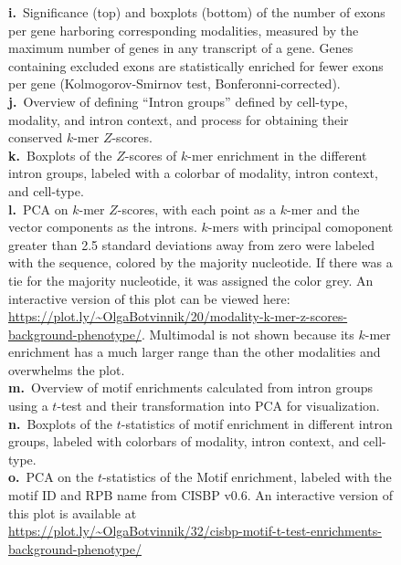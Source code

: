 \begin{figure}[h]
{\textbf{i.}~Significance (top) and boxplots (bottom) of the number of exons per gene harboring corresponding modalities, measured by the maximum number of genes in any transcript of a gene. Genes containing excluded exons are statistically enriched for fewer exons per gene (Kolmogorov-Smirnov test, Bonferonni-corrected).\\
\textbf{j.}~Overview of defining ``Intron groups'' defined by cell-type, modality, and intron context, and process for obtaining their conserved $k$-mer $Z$-scores.\\
\textbf{k.}~Boxplots of the $Z$-scores of $k$-mer enrichment in the different intron groups, labeled with a colorbar of modality, intron context, and cell-type.\\
\textbf{l.}~PCA on $k$-mer $Z$-scores, with each point as a $k$-mer and the vector components as the introns. $k$-mers with principal comoponent greater than 2.5 standard deviations away from zero were labeled with the sequence, colored by the majority nucleotide. If there was a tie for the majority nucleotide, it was assigned the color grey. An interactive version of this plot can be viewed here: \url{https://plot.ly/~OlgaBotvinnik/20/modality-k-mer-z-scores-background-phenotype/}. Multimodal is not shown because its $k$-mer enrichment has a much larger range than the other modalities and overwhelms the plot.\\
\textbf{m.}~Overview of motif enrichments calculated from intron groups using a $t$-test and their transformation into PCA for visualization.\\
\textbf{n.}~Boxplots of the $t$-statistics of motif enrichment in different intron groups, labeled with colorbars of modality, intron context, and cell-type.\\
\textbf{o.}~PCA on the $t$-statistics of the Motif enrichment, labeled with the motif ID and RPB name from CISBP v0.6. An interactive version of this plot is available at\\\url{https://plot.ly/~OlgaBotvinnik/32/cisbp-motif-t-test-enrichments-background-phenotype/}
}
\label{fig:supp_modality_features}
\end{figure}


